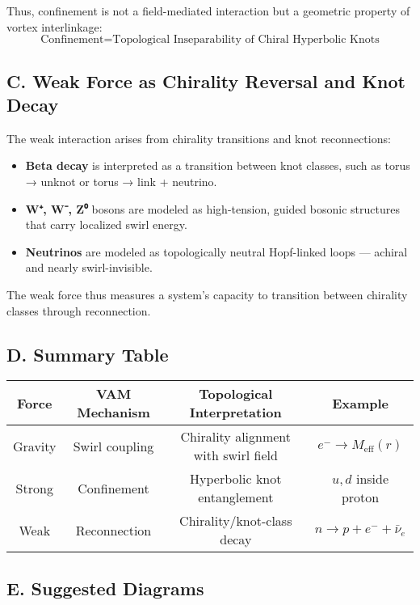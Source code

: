 \documentclass[12pt]{article}
\begin{document}
Thus, confinement is not a field-mediated interaction but a geometric property of vortex interlinkage:
\[
\text{Confinement} = \text{Topological Inseparability of Chiral Hyperbolic Knots}
\]

\subsection*{C. Weak Force as Chirality Reversal and Knot Decay}

The weak interaction arises from chirality transitions and knot reconnections:

\begin{itemize}
    \item \textbf{Beta decay} is interpreted as a transition between knot classes, such as torus → unknot or torus → link + neutrino.
    \item \textbf{W⁺, W⁻, Z⁰} bosons are modeled as high-tension, guided bosonic structures that carry localized swirl energy.
    \item \textbf{Neutrinos} are modeled as topologically neutral Hopf-linked loops — achiral and nearly swirl-invisible.
\end{itemize}

The weak force thus measures a system’s capacity to transition between chirality classes through reconnection.

\subsection*{D. Summary Table}

\begin{center}
\begin{tabular}{|c|c|c|c|}
\hline
\textbf{Force} & \textbf{VAM Mechanism} & \textbf{Topological Interpretation} & \textbf{Example} \\
\hline
Gravity & Swirl coupling & Chirality alignment with swirl field & \( e^- \rightarrow M_{\text{eff}}(r) \) \\
Strong & Confinement & Hyperbolic knot entanglement & \( u, d \) inside proton \\
Weak & Reconnection & Chirality/knot-class decay & \( n \rightarrow p + e^- + \bar{\nu}_e \) \\
\hline
\end{tabular}
\end{center}

\subsection*{E. Suggested Diagrams}
\end{document}
